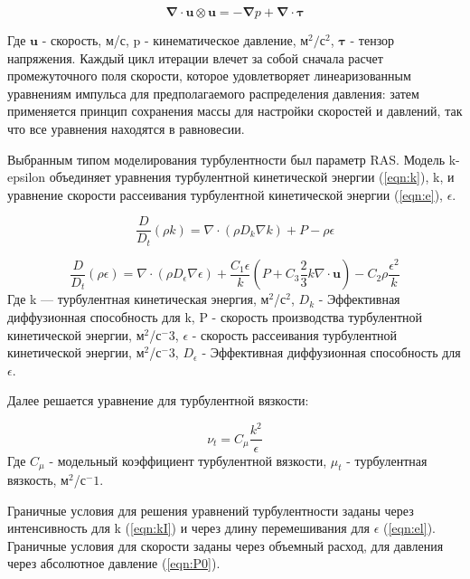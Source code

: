 \documentclass[10pt,a4paper]{book}
\begin{document}
    \begin{equation}\label{eqn:simpleFoam2}
        \bm{\nabla} \cdot \bm{u} \otimes \bm{u} = -\bm{\nabla} p + \bm{\nabla} \cdot \bm{\tau}
    \end{equation} 
    
    Где $\bm{u}$ - скорость, м/с, p - кинематическое давление, м$^{2}/$с$^{2}$, $\bm{\tau}$ - тензор напряжения. 
    Каждый цикл итерации влечет за собой сначала расчет промежуточного поля скорости, которое удовлетворяет линеаризованным уравнениям импульса для предполагаемого распределения давления: затем применяется принцип сохранения массы для настройки скоростей и давлений, так что все уравнения находятся в равновесии.
    
    Выбранным типом моделирования турбулентности был параметр RAS. Модель k-epsilon объединяет уравнения турбулентной кинетической энергии (\ref{eqn:k}), k, и уравнение скорости рассеивания турбулентной кинетической энергии (\ref{eqn:e}), $\epsilon$.
    
    \begin{equation}\label{eqn:k}
        \frac{D}{D_{t}}(\rho k) = \nabla \cdot (\rho D_{k}\nabla k) + P - \rho\epsilon
    \end{equation} 
    
    \begin{equation}\label{eqn:e}
        \frac{D}{D_{t}}(\rho\epsilon) = \nabla \cdot (\rho D_{\epsilon}\nabla\epsilon) + \frac{C_{1}\epsilon}{k}(P + C_{3}\frac{2}{3}k\nabla \cdot \bm{u}) - C_{2}\rho\frac{\epsilon^2}{k}
    \end{equation} 
    Где k --- турбулентная кинетическая энергия, м$^2$/с$^2$, $D_{k}$ - Эффективная диффузионная способность для k, P - скорость производства турбулентной кинетической энергии, м$^2$/с$^-3$, $\epsilon$ - скорость рассеивания турбулентной кинетической энергии, м$^2$/с$^-3$, $D_{\epsilon}$ - Эффективная диффузионная способность для $\epsilon$.
    
    Далее решается уравнение для турбулентной вязкости:
    
    \begin{equation}\label{eqn:mu}
        \nu_{t} = C_{\mu}\frac{k^2}{\epsilon}
    \end{equation} 
    Где $C_{\mu}$ - модельный коэффициент турбулентной вязкости, $\mu_{t}$ - турбулентная вязкость, м$^2$/с$^-1$.
    
    Граничные условия для решения уравнений турбулентности заданы через интенсивность для k (\ref{eqn:kI}) и через длину перемешивания для $\epsilon$ (\ref{eqn:el}). Граничные условия для скорости заданы через объемный расход, для давления через абсолютное давление (\ref{eqn:P0}).
    
\end{document}
